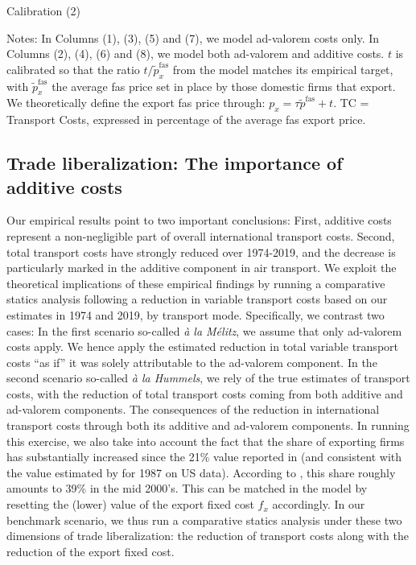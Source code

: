 \documentclass[a4paper,11pt]{article}
\begin{document}
\begin{table}[htbp]
  \centering
  \caption{Calibration (2)}\label{tab:calib_TC}
\begin{center}
	
\end{center}
{\parbox[l]{12cm}{ \vspace{4pt}\footnotesize{Notes: In Columns (1), (3), (5) and (7), we model ad-valorem costs only. In Columns (2), (4), (6) and (8), we model both ad-valorem and additive costs. $t$ is calibrated so that the ratio $t/\widetilde{p}^{\text{fas}}_x$ from the model matches its empirical target, with $\widetilde{p}^{\text{fas}}_x$ the average fas price set in place by those domestic firms that export. We theoretically define the export fas price through: $p_x = \tau \widetilde{p}^{\text{fas}} +t$. TC = Transport Costs, expressed in percentage of the average fas export price.}}}
\end{table}


\subsection{Trade liberalization: The importance of additive costs}

Our empirical results point to two important conclusions: First, additive costs represent a non-negligible part of overall international transport costs. Second, total transport costs have strongly reduced over 1974-2019, and the decrease is particularly marked in the additive component in air transport. We exploit the theoretical implications of these empirical findings by running a comparative statics analysis following a reduction in variable transport costs based on our estimates in 1974 and 2019, by transport mode. Specifically, we contrast two cases: In the first scenario so-called \textit{à la Mélitz}, we assume that only ad-valorem costs apply. We hence apply the estimated reduction in total variable transport costs ``as if'' it was solely attributable to the ad-valorem component. In the second scenario so-called \textit{à la Hummels}, we rely of the true estimates of transport costs, with the reduction of total transport costs coming from both additive and ad-valorem components. The consequences of the reduction in international transport costs through both its additive and ad-valorem components. In running this exercise, we also take into account the fact that the share of exporting firms has substantially increased since the 21\% value reported in \cite{BEJK-AER-03} (and consistent with the value estimated by \citet{Lincoln_McCallum2018} for 1987 on US data). According to \cite{Lincoln_McCallum2018}, this share roughly amounts to 39\% in the mid 2000's. This can be matched in the model by resetting the (lower) value of the export fixed cost $f_x$ accordingly. In our benchmark scenario, we thus run a comparative statics analysis under these two dimensions of trade liberalization: the reduction of transport costs along with the reduction of the export fixed cost. 
\end{document}
